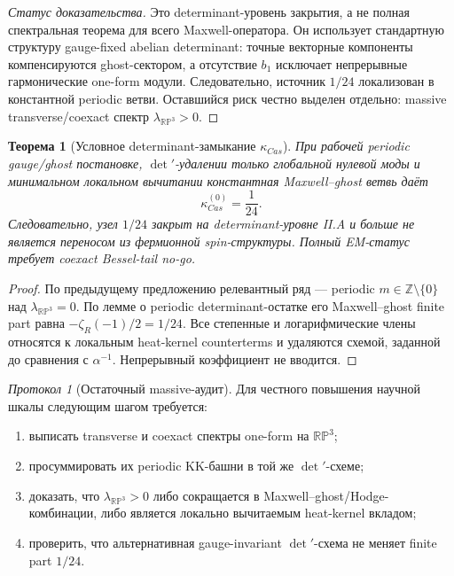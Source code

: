 \documentclass[12pt,a4paper]{report}
\newtheorem{theorem}{Теорема}[chapter]
\theoremstyle{remark}
\newtheorem{protocol}{Протокол}[chapter]
\begin{document}
\begin{proof}[Статус доказательства]
Это determinant-уровень закрытия, а не полная спектральная теорема для всего Maxwell-оператора. Он использует стандартную структуру gauge-fixed abelian determinant: точные векторные компоненты компенсируются ghost-сектором, а отсутствие \(b_1\) исключает непрерывные гармонические one-form модули. Следовательно, источник \(1/24\) локализован в константной periodic ветви. Оставшийся риск честно выделен отдельно: massive transverse/coexact спектр \(\lambda_{\mathbb{RP}^3}>0\).
\end{proof}

\begin{theorem}[Условное determinant-замыкание \(\kappa_{Cas}\)]
При рабочей periodic gauge/ghost постановке, \(\det'\)-удалении только глобальной нулевой моды и минимальном локальном вычитании константная Maxwell--ghost ветвь даёт
\begin{equation}
    \kappa_{Cas}^{(0)}=\frac{1}{24}.
\end{equation}
Следовательно, узел \(1/24\) закрыт на determinant-уровне II.A и больше не является переносом из фермионной spin-структуры. Полный EM-статус требует coexact Bessel-tail no-go.
\end{theorem}

\begin{proof}
По предыдущему предложению релевантный ряд --- periodic \(m\in\mathbb{Z}\setminus\{0\}\) над \(\lambda_{\mathbb{RP}^3}=0\). По лемме о periodic determinant-остатке его Maxwell--ghost finite part равна \(-\zeta_R(-1)/2=1/24\). Все степенные и логарифмические члены относятся к локальным heat-kernel counterterms и удаляются схемой, заданной до сравнения с \(\alpha^{-1}\). Непрерывный коэффициент не вводится.
\end{proof}

\begin{protocol}[Остаточный massive-аудит]
Для честного повышения научной шкалы следующим шагом требуется:
\begin{enumerate}
    \item выписать transverse и coexact спектры one-form на \(\mathbb{RP}^3\);
    \item просуммировать их periodic KK-башни в той же \(\det'\)-схеме;
    \item доказать, что \(\lambda_{\mathbb{RP}^3}>0\) либо сокращается в Maxwell--ghost/Hodge-комбинации, либо является локально вычитаемым heat-kernel вкладом;
    \item проверить, что альтернативная gauge-invariant \(\det'\)-схема не меняет finite part \(1/24\).
\end{enumerate}
\end{protocol}
\end{document}
